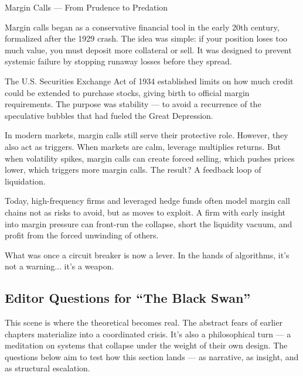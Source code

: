 \begin{TechnicalSidebar}{Margin Calls --- From Prudence to Predation}

  Margin calls began as a conservative financial tool in the early 20th century, formalized after the 1929 crash. 
  The idea was simple: if your position loses too much value, you must deposit more collateral or sell. It was 
  designed to prevent systemic failure by stopping runaway losses before they spread.

  \medskip
  
  The U.S. Securities Exchange Act of 1934 established limits on how much credit could be extended to purchase 
  stocks, giving birth to official margin requirements. The purpose was stability — to avoid a recurrence of the 
  speculative bubbles that had fueled the Great Depression.

  \medskip
  
  In modern markets, margin calls still serve their protective role. However, they also act as triggers. When markets 
  are calm, leverage multiplies returns. But when volatility spikes, margin calls can create forced selling, which 
  pushes prices lower, which triggers more margin calls. The result? A feedback loop of liquidation.

  \medskip
  
  Today, high-frequency firms and leveraged hedge funds often model margin call chains not as risks to avoid, but 
  as moves to exploit. A firm with early insight into margin pressure can front-run the collapse, short the 
  liquidity vacuum, and profit from the forced unwinding of others.
  
  \medskip
  
  What was once a circuit breaker is now a lever. In the hands of algorithms, it’s not a warning... it’s a weapon.
  
\end{TechnicalSidebar}

\subsection{Editor Questions for ``The Black Swan''}

This scene is where the theoretical becomes real. The abstract fears of earlier chapters materialize into a coordinated crisis. 
It’s also a philosophical turn — a meditation on systems that collapse under the weight of their own design. The questions 
below aim to test how this section lands — as narrative, as insight, and as structural escalation.

